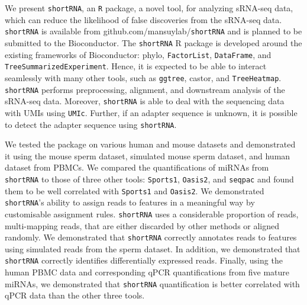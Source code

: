 \documentclass[12pt,twoside]{reedthesis}
\begin{document}
We present \texttt{shortRNA}, an \texttt{R} package, a novel tool, for analyzing sRNA-seq
data, which can reduce the likelihood of false discoveries from the
sRNA-seq data. \texttt{shortRNA} is available from github.com/mansuylab/\texttt{shortRNA}
and is planned to be submitted to the Bioconductor. The \texttt{shortRNA} R
package is developed around the existing frameworks of Bioconductor:
phylo, \texttt{FactorList}, \texttt{DataFrame}, and \texttt{TreeSummarizedExperiment}. Hence, it is
expected to be able to interact seamlessly with many other tools, such
as \texttt{ggtree}, castor, and \texttt{TreeHeatmap}. \texttt{shortRNA} performs preprocessing,
alignment, and downstream analysis of the sRNA-seq data. Moreover,
\texttt{shortRNA} is able to deal with the sequencing data with UMIs using \texttt{UMIc}.
Further, if an adapter sequence is unknown, it is possible to detect the
adapter sequence using \texttt{shortRNA}.

We tested the package on various human and mouse datasets and
demonstrated it using the mouse sperm dataset, simulated mouse sperm
dataset, and human dataset from PBMCs. We compared the quantifications
of miRNAs from \texttt{shortRNA} to those of three other tools: \texttt{Sports1}, \texttt{Oasis2},
and \texttt{seqpac} and found them to be well correlated with \texttt{Sports1} and \texttt{Oasis2}.
We demonstrated \texttt{shortRNA}'s ability to assign reads to features in a
meaningful way by customisable assignment rules. \texttt{shortRNA} uses a
considerable proportion of reads, multi-mapping reads, that are either
discarded by other methods or aligned randomly. We demonstrated that
\texttt{shortRNA} correctly annotates reads to features using simulated reads
from the sperm dataset. In addition, we demonstrated that \texttt{shortRNA}
correctly identifies differentially expressed reads. Finally, using the
human PBMC data and corresponding qPCR quantifications from five mature
miRNAs, we demonstrated that \texttt{shortRNA} quantification is better
correlated with qPCR data than the other three tools.
\end{document}
